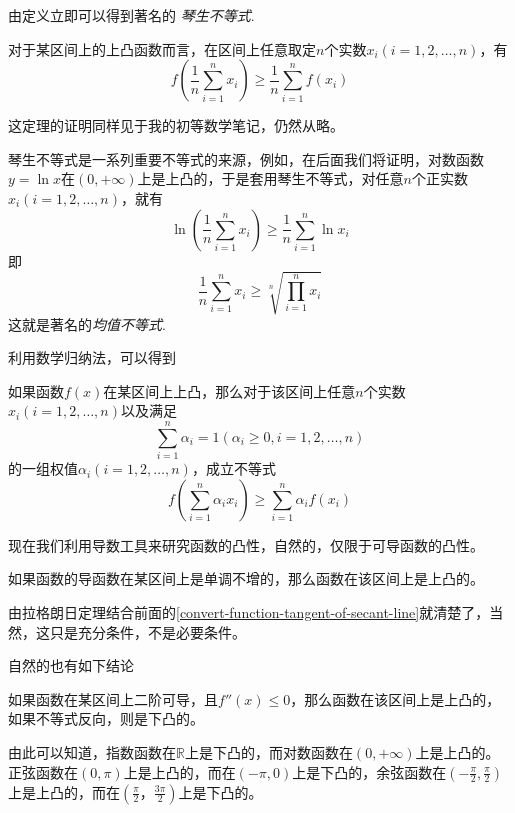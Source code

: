 由定义立即可以得到著名的 \emph{琴生不等式}.
\begin{theorem}
  对于某区间上的上凸函数而言，在区间上任意取定$n$个实数$x_i(i=1,2,\ldots,n)$，有
  \[ f \left( \frac{1}{n} \sum_{i=1}^n x_i \right) \geqslant \frac{1}{n} \sum_{i=1}^n f(x_i) \]
\end{theorem}

这定理的证明同样见于我的初等数学笔记，仍然从略。

\begin{example}
  琴生不等式是一系列重要不等式的来源，例如，在后面我们将证明，对数函数$y=\ln{x}$在$(0,+\infty)$上是上凸的，于是套用琴生不等式，对任意$n$个正实数$x_i(i=1,2,\ldots,n)$，就有
  \[ \ln{\left( \frac{1}{n} \sum_{i=1}^n x_i \right)} \geqslant \frac{1}{n} \sum_{i=1}^n \ln{x_i} \]
  即
  \[ \frac{1}{n} \sum_{i=1}^n x_i \geqslant \sqrt[n]{\prod_{i=1}^n x_i} \]
  这就是著名的\emph{均值不等式}.
\end{example}

利用数学归纳法，可以得到
\begin{theorem}
  如果函数$f(x)$在某区间上上凸，那么对于该区间上任意$n$个实数$x_i(i=1,2,\ldots,n)$以及满足
  \[ \sum_{i=1}^n \alpha_i=1(\alpha_i \geqslant 0,i=1,2,\ldots,n) \]
  的一组权值$\alpha_i(i=1,2,\ldots,n)$，成立不等式
  \[ f \left( \sum_{i=1}^n \alpha_i x_i \right) \geqslant \sum_{i=1}^n \alpha_i f(x_i) \]
\end{theorem}

现在我们利用导数工具来研究函数的凸性，自然的，仅限于可导函数的凸性。

\begin{theorem}
  如果函数的导函数在某区间上是单调不增的，那么函数在该区间上是上凸的。
\end{theorem}
由拉格朗日定理结合前面的\autoref{convert-function-tangent-of-secant-line}就清楚了，当然，这只是充分条件，不是必要条件。

自然的也有如下结论
\begin{inference}
  如果函数在某区间上二阶可导，且$f''(x) \leqslant 0$，那么函数在该区间上是上凸的，如果不等式反向，则是下凸的。
\end{inference}

\begin{example}
  由此可以知道，指数函数在$\mathbb{R}$上是下凸的，而对数函数在$(0,+\infty)$上是上凸的。正弦函数在$(0,\pi)$上是上凸的，而在$(-\pi,0)$上是下凸的，余弦函数在$(-\frac{\pi}{2},\frac{\pi}{2})$上是上凸的，而在$(\frac{\pi}{2}，\frac{3\pi}{2})$上是下凸的。
\end{example}

